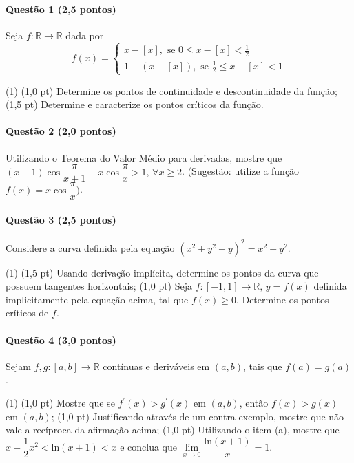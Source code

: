 \documentclass[12pt,a4paper]{article}
\newcommand{\R}{\mathbb{R}}
\begin{document}
\paragraph{Questão 1 (2,5 pontos)}

Seja $f: \R \to \R$ dada por $$f(x) = \begin{cases}x-[x],\text{ se }0\le x-[x]< \frac{1}{2} \\ 1 - (x-[x]), \text{ se }\frac{1}{2} \le x - [x] < 1 \end{cases}$$

\begin{tasks}(1)
\task (1,0 pt) Determine os pontos de continuidade e descontinuidade da função;
\task (1,5 pt) Determine e caracterize os pontos críticos da função.
\end{tasks}

\paragraph{Questão 2 (2,0 pontos)}

Utilizando o Teorema do Valor Médio para derivadas, mostre que $(x+1)\cos \dfrac{\pi}{x+1} - x\cos \dfrac{\pi}{x} > 1,\, \forall x \ge 2$. (Sugestão: utilize a função $f(x) = x\cos \dfrac{\pi}{x})$.

\paragraph{Questão 3 (2,5 pontos)}

Considere a curva definida pela equação $(x^2 + y^2 + y)^2 = x^2 + y^2$.

\begin{tasks}(1)
\task (1,5 pt) Usando derivação implícita, determine os pontos da curva que possuem tangentes horizontais;
\task (1,0 pt) Seja $f:[-1,1] \to \R,\, y=f(x)$ definida implicitamente pela equação acima, tal que $f(x) \ge 0$. Determine os pontos críticos de $f$.
\end{tasks}

\paragraph{Questão 4 (3,0 pontos)}

Sejam $f, g: [a,b] \to \R$ contínuas e deriváveis em $(a,b)$, tais que $f(a) = g(a)$.

\begin{tasks}(1)
\task (1,0 pt) Mostre que se $f^{\prime}(x) > g^{\prime}(x)$ em $(a,b)$, então $f(x)>g(x)$ em $(a,b)$;
\task (1,0 pt) Justificando através de um contra-exemplo, mostre que não vale a recíproca da afirmação acima;
\task (1,0 pt) Utilizando o item (a), mostre que $x-\dfrac{1}{2}x^2< \mathrm{ln} (x+1) < x$ e conclua que $\lim\limits_{x\to 0} \dfrac{\mathrm{ln}(x+1)}{x} = 1$.
\end{tasks}
\end{document}
